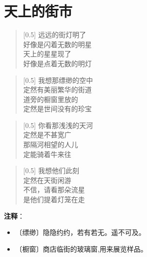 \documentclass[12pt,UTF-8,openany]{ctexbook}
\begin{document}
\chapter{天上的街市}

\begin{normalsize}
    
    \begin{verse}[0.5\linewidth]
        远远的街灯明了 \\
        好像是闪着无数的明星 \\
        天上的星星现了 \\
        好像是点着无数的明灯
    \end{verse}
    
    
    \begin{verse}[0.5\linewidth]
        我想那缥缈的空中 \\
        定然有美丽繁华的街道 \\
        道旁的橱窗里放的 \\
        定然是世间没有的珍宝
    \end{verse}
    
    
    \begin{verse}[0.5\linewidth]
        你看那浅浅的天河 \\
        定然是不甚宽广 \\
        那隔河相望的人儿 \\
        定能骑着牛来往
    \end{verse}
    
    
    \begin{verse}[0.5\linewidth]
        我想他们此刻 \\
        定然在天街闲游 \\
        不信，请看那朵流星 \\
        是他们提着灯笼在走
    \end{verse}
    
\end{normalsize}


\newpage

\textbf{注释}：

\vspace{-1em}

\begin{itemize}
    \setlength\itemsep{-0.2em}
    \item 〔缥缈〕隐隐约约，若有若无。遥不可及。
    \item 〔橱窗〕商店临街的玻璃窗,用来展览样品。
\end{itemize}
\end{document}
